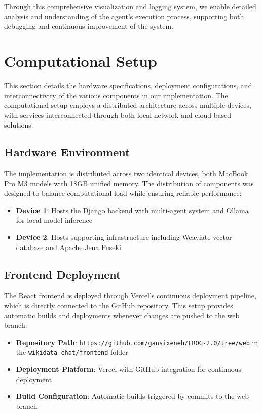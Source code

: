 Through this comprehensive visualization and logging system, we enable detailed analysis and understanding of the agent's execution process, supporting both debugging and continuous improvement of the system.

\section{Computational Setup}
\label{sec:computational-setup}

This section details the hardware specifications, deployment configurations, and interconnectivity of the various components in our implementation. The computational setup employs a distributed architecture across multiple devices, with services interconnected through both local network and cloud-based solutions.

\subsection{Hardware Environment}
The implementation is distributed across two identical devices, both MacBook Pro M3 models with 18GB unified memory. The distribution of components was designed to balance computational load while ensuring reliable performance:

\begin{itemize}
    \item \textbf{Device 1}: Hosts the Django backend with multi-agent system and Ollama for local model inference
    \item \textbf{Device 2}: Hosts supporting infrastructure including Weaviate vector database and Apache Jena Fuseki
\end{itemize}

\subsection{Frontend Deployment}
The React frontend is deployed through Vercel's continuous deployment pipeline, which is directly connected to the GitHub repository. This setup provides automatic builds and deployments whenever changes are pushed to the web branch:

\begin{itemize}
    \item \textbf{Repository Path}: \texttt{https://github.com/gansixeneh/FROG-2.0/tree/web} in the \texttt{wikidata-chat/frontend} folder
    \item \textbf{Deployment Platform}: Vercel with GitHub integration for continuous deployment
    \item \textbf{Build Configuration}: Automatic builds triggered by commits to the web branch
\end{itemize}

